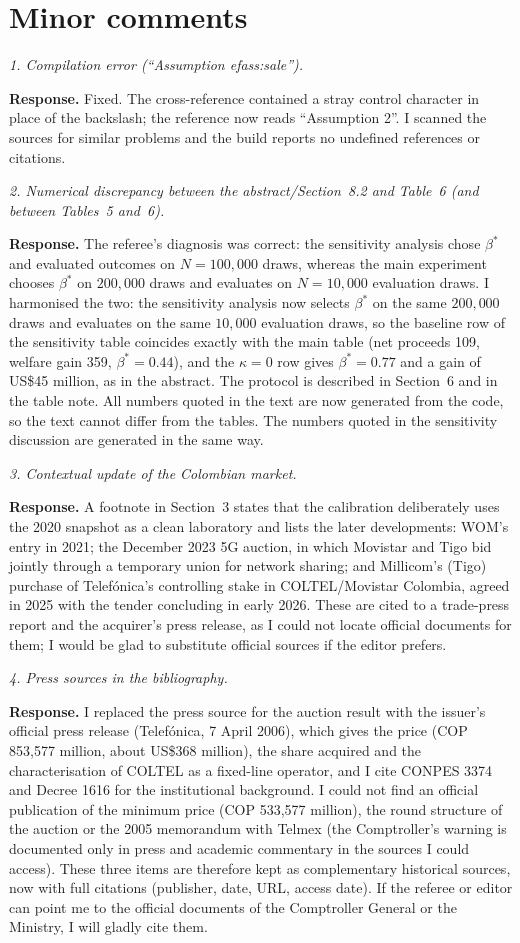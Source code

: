 \documentclass[11pt,a4paper]{article}
\newcommand{\rep}[1]{\par\smallskip\noindent\textbf{Response.} #1\par\bigskip}
\newcommand{\com}[1]{\par\medskip\noindent\textit{#1}\par}
\begin{document}
\section*{Minor comments}

\com{1. Compilation error (``Assumption efass:sale'').}
\rep{Fixed. The cross-reference contained a stray control character in place of the backslash; the reference now reads ``Assumption 2''. I scanned the sources for similar problems and the build reports no undefined references or citations.}

\com{2. Numerical discrepancy between the abstract/Section~8.2 and Table~6 (and between Tables~5 and~6).}
\rep{The referee's diagnosis was correct: the sensitivity analysis chose $\beta^*$ and evaluated outcomes on $N=100{,}000$ draws, whereas the main experiment chooses $\beta^*$ on $200{,}000$ draws and evaluates on $N=10{,}000$ evaluation draws. I harmonised the two: the sensitivity analysis now selects $\beta^*$ on the same $200{,}000$ draws and evaluates on the same $10{,}000$ evaluation draws, so the baseline row of the sensitivity table coincides exactly with the main table (net proceeds 109, welfare gain 359, $\beta^*=0.44$), and the $\kappa=0$ row gives $\beta^*=0.77$ and a gain of US\$45 million, as in the abstract. The protocol is described in Section~6 and in the table note. All numbers quoted in the text are now generated from the code, so the text cannot differ from the tables. The numbers quoted in the sensitivity discussion are generated in the same way.}

\com{3. Contextual update of the Colombian market.}
\rep{A footnote in Section~3 states that the calibration deliberately uses the 2020 snapshot as a clean laboratory and lists the later developments: WOM's entry in 2021; the December 2023 5G auction, in which Movistar and Tigo bid jointly through a temporary union for network sharing; and Millicom's (Tigo) purchase of Telef\'onica's controlling stake in COLTEL/Movistar Colombia, agreed in 2025 with the tender concluding in early 2026. These are cited to a trade-press report and the acquirer's press release, as I could not locate official documents for them; I would be glad to substitute official sources if the editor prefers.}

\com{4. Press sources in the bibliography.}
\rep{I replaced the press source for the auction result with the issuer's official press release (Telef\'onica, 7 April 2006), which gives the price (COP 853,577 million, about US\$368 million), the share acquired and the characterisation of COLTEL as a fixed-line operator, and I cite CONPES 3374 and Decree 1616 for the institutional background. I could not find an official publication of the minimum price (COP 533,577 million), the round structure of the auction or the 2005 memorandum with Telmex (the Comptroller's warning is documented only in press and academic commentary in the sources I could access). These three items are therefore kept as complementary historical sources, now with full citations (publisher, date, URL, access date). If the referee or editor can point me to the official documents of the Comptroller General or the Ministry, I will gladly cite them.}
\end{document}
